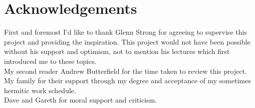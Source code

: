 \section*{Acknowledgements}
First and foremost I'd like to thank Glenn Strong for agreeing
to supervise this project and providing the inspiration. This
project would not have been possible without his support and
optimism, not to mention his lectures which first introduced
me to these topics. \\ 

\noindent My second reader Andrew Butterfield for the time taken to review
this project. \\

\noindent My family for their support through my degree and acceptance of
my sometimes hermitic work schedule. \\

\noindent Dave and Gareth for moral support and criticism. 



